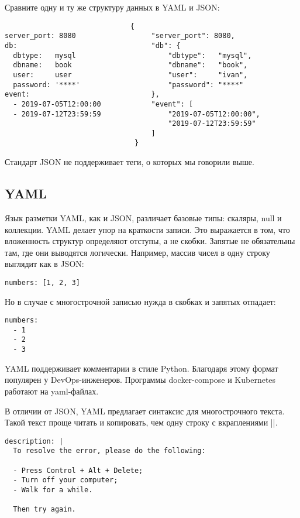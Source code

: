 Сравните одну и ту же структуру данных в YAML и JSON:

\begin{verbatim}
                              {
server_port: 8080                  "server_port": 8080,
db:                                "db": {
  dbtype:   mysql                      "dbtype":   "mysql",
  dbname:   book                       "dbname":   "book",
  user:     user                       "user":     "ivan",
  password: '****'                     "password": "****"
event:                             },
  - 2019-07-05T12:00:00            "event": [
  - 2019-07-12T23:59:59                "2019-07-05T12:00:00",
                                       "2019-07-12T23:59:59"
                                   ]
                               }
\end{verbatim}

Стандарт JSON не поддерживает теги, о которых мы говорили выше.

\subsection{YAML}

Язык разметки YAML, как и JSON, различает базовые типы: скаляры, null и
коллекции. YAML делает упор на краткости записи. Это выражается в том, что
вложенность структур определяют отступы, а не скобки. Запятые не обязательны
там, где они выводятся логически. Например, массив чисел в одну строку выглядит
как в JSON:

\begin{verbatim}
numbers: [1, 2, 3]
\end{verbatim}

Но в случае с многострочной записью нужда в скобках и запятых отпадает:

\begin{verbatim}
numbers:
  - 1
  - 2
  - 3
\end{verbatim}

YAML поддерживает комментарии в стиле Python. Благодаря этому формат популярен у
DevOps-инженеров. Программы docker-compose и Kubernetes работают на yaml-файлах.

В отличии от JSON, YAML предлагает синтаксис для многострочного текста. Такой
текст проще читать и копировать, чем одну строку с вкраплениями \spverb|\n|.

\begin{verbatim}
description: |
  To resolve the error, please do the following:

  - Press Control + Alt + Delete;
  - Turn off your computer;
  - Walk for a while.

  Then try again.
\end{verbatim}

